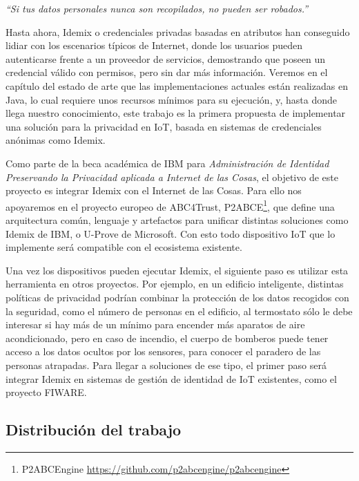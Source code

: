 \begin{center}
	\textit{``Si tus datos personales nunca son recopilados, no pueden ser robados.''}
\end{center}

Hasta ahora, Idemix o credenciales privadas basadas en atributos han conseguido lidiar con los escenarios típicos de Internet, donde los usuarios pueden autenticarse frente a un proveedor de servicios, demostrando que poseen un credencial válido con permisos, pero sin dar más información. Veremos en el capítulo del estado de arte que las implementaciones actuales están realizadas en Java, lo cual requiere unos recursos mínimos para su ejecución, y, hasta donde llega nuestro conocimiento, este trabajo es la primera propuesta de implementar una solución para la privacidad en IoT, basada en sistemas de credenciales anónimas como Idemix.

\hfil

Como parte de la beca académica de IBM para \textit{Administración de Identidad Preservando la Privacidad aplicada a Internet de las Cosas}, el objetivo de este proyecto es integrar Idemix con el Internet de las Cosas. Para ello nos apoyaremos en el proyecto europeo de ABC4Trust, \ac{P2ABCE}\footnote{P2ABCEngine \url{https://github.com/p2abcengine/p2abcengine}}, que define una arquitectura común, lenguaje y artefactos para unificar distintas soluciones como Idemix de IBM, o U-Prove de Microsoft. Con esto todo dispositivo IoT que lo implemente será compatible con el ecosistema existente.

Una vez los dispositivos pueden ejecutar Idemix, el siguiente paso es utilizar esta herramienta en otros proyectos. Por ejemplo, en un edificio inteligente, distintas políticas de privacidad podrían combinar la protección de los datos recogidos con la seguridad, como el número de personas en el edificio, al termostato sólo le debe interesar si hay más de un mínimo para encender más aparatos de aire acondicionado, pero en caso de incendio, el cuerpo de bomberos puede tener acceso a los datos ocultos por los sensores, para conocer el paradero de las personas atrapadas. Para llegar a soluciones de ese tipo, el primer paso será integrar Idemix en sistemas de gestión de identidad de IoT existentes, como el proyecto FIWARE.

\hfil


\subsection*{Distribución del trabajo}


